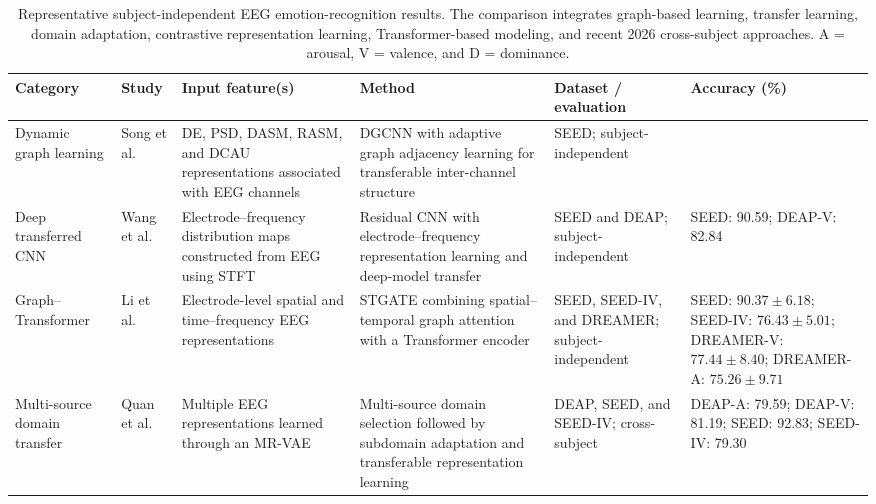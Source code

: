\documentclass{WileyMSP-template}
\begin{document}
\begin{table}
\centering
\caption{Representative subject-independent EEG emotion-recognition results. 
The comparison integrates graph-based learning, transfer learning, domain adaptation,
contrastive representation learning, Transformer-based modeling, and recent 2026
cross-subject approaches. A = arousal, V = valence, and D = dominance.}
\label{tab:subject_independent_results}

\scriptsize
\setlength{\tabcolsep}{3.0pt}
\renewcommand{\arraystretch}{1.15}

\begin{tabularx}{\textheight}{
>{\raggedright\arraybackslash}p{2.55cm}
>{\raggedright\arraybackslash}p{3.15cm}
>{\raggedright\arraybackslash}X
>{\raggedright\arraybackslash}X
>{\raggedright\arraybackslash}p{3.45cm}
>{\raggedright\arraybackslash}p{5.0cm}}
\toprule

\textbf{Category} &
\textbf{Study} &
\textbf{Input feature(s)} &
\textbf{Method} &
\textbf{Dataset / evaluation} &
\textbf{Accuracy (\%)} \\

\midrule

Dynamic graph learning &
Song et al. \cite{song2020dgcnn} &
DE, PSD, DASM, RASM, and DCAU representations associated with EEG channels &
DGCNN with adaptive graph adjacency learning for transferable inter-channel structure &
SEED; subject-independent &
79.95 \\

Deep transferred CNN &
Wang et al. \cite{wang2020efdmcnn} &
Electrode--frequency distribution maps constructed from EEG using STFT &
Residual CNN with electrode--frequency representation learning and deep-model transfer &
SEED and DEAP; subject-independent &
SEED: 90.59; DEAP-V: 82.84 \\

Graph--Transformer &
Li et al. \cite{li2023stgate} &
Electrode-level spatial and time--frequency EEG representations &
STGATE combining spatial--temporal graph attention with a Transformer encoder &
SEED, SEED-IV, and DREAMER; subject-independent &
SEED: $90.37 \pm 6.18$; SEED-IV: $76.43 \pm 5.01$; 
DREAMER-V: $77.44 \pm 8.40$; DREAMER-A: $75.26 \pm 9.71$ \\

Multi-source domain transfer &
Quan et al. \cite{quan2023bspc_multisource_transfer} &
Multiple EEG representations learned through an MR-VAE &
Multi-source domain selection followed by subdomain adaptation and transferable representation learning &
DEAP, SEED, and SEED-IV; cross-subject &
DEAP-A: 79.59; DEAP-V: 81.19; SEED: 92.83; SEED-IV: 79.30 \\


\end{tabularx}
\end{table}
\end{document}
